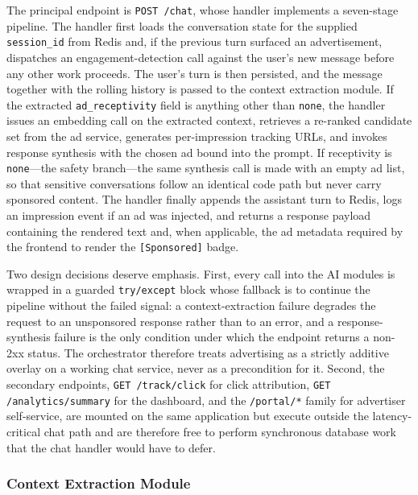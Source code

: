 The principal endpoint is \texttt{POST /chat}, whose handler implements
a seven-stage pipeline. The handler first loads the conversation state
for the supplied \texttt{session\_id} from Redis and, if the previous
turn surfaced an advertisement, dispatches an engagement-detection
call against the user's new message before any other work proceeds.
The user's turn is then persisted, and the message together with the
rolling history is passed to the context extraction module. If the
extracted \texttt{ad\_receptivity} field is anything other than
\texttt{none}, the handler issues an embedding call on the extracted
context, retrieves a re-ranked candidate set from the ad service,
generates per-impression tracking URLs, and invokes response synthesis
with the chosen ad bound into the prompt. If receptivity is
\texttt{none}---the safety branch---the same synthesis call is made
with an empty ad list, so that sensitive conversations follow an
identical code path but never carry sponsored content. The handler
finally appends the assistant turn to Redis, logs an impression event
if an ad was injected, and returns a response payload containing the
rendered text and, when applicable, the ad metadata required by the
frontend to render the \texttt{[Sponsored]} badge.

Two design decisions deserve emphasis. First, every call into the AI
modules is wrapped in a guarded \texttt{try/except} block whose
fallback is to continue the pipeline without the failed signal: a
context-extraction failure degrades the request to an unsponsored
response rather than to an error, and a response-synthesis failure is
the only condition under which the endpoint returns a non-2xx status.
The orchestrator therefore treats advertising as a strictly additive
overlay on a working chat service, never as a precondition for it.
Second, the secondary endpoints, \texttt{GET /track/click} for click
attribution, \texttt{GET /analytics/summary} for the dashboard, and
the \texttt{/portal/*} family for advertiser self-service, are mounted
on the same application but execute outside the latency-critical chat
path and are therefore free to perform synchronous database work that
the chat handler would have to defer.

\subsubsection{Context Extraction Module}
\label{subsubsec:context-extraction}

